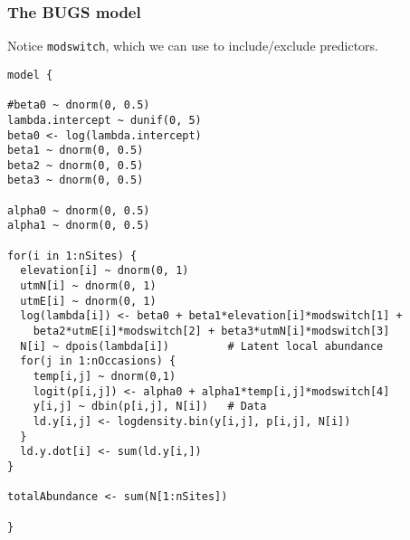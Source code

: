 \documentclass[color=usenames,dvipsnames]{beamer}\usepackage[]{graphicx}\usepackage[]{color}
\makeatletter
\newenvironment{kframe}{%
 \def\at@end@of@kframe{}%
 \ifinner\ifhmode%
  \def\at@end@of@kframe{\end{minipage}}%
  \begin{minipage}{\columnwidth}%
 \fi\fi%
 \def\FrameCommand##1{\hskip\@totalleftmargin \hskip-\fboxsep
 \colorbox{shadecolor}{##1}\hskip-\fboxsep
     \hskip-\linewidth \hskip-\@totalleftmargin \hskip\columnwidth}%
 \MakeFramed {\advance\hsize-\width
   \@totalleftmargin\z@ \linewidth\hsize
   \@setminipage}}%
 {\par\unskip\endMakeFramed%
 \at@end@of@kframe}
\newenvironment{knitrout}{}{} %
\makeatother
\begin{document}
\begin{frame}[fragile]
  \frametitle{The BUGS model}
  \small
  Notice \alert{\tt modswitch}, which we can use to include/exclude
  predictors. 
  \tiny
\begin{knitrout}\tiny
{}\color{fgcolor}\begin{kframe}
\begin{verbatim}
model {

#beta0 ~ dnorm(0, 0.5)  
lambda.intercept ~ dunif(0, 5)
beta0 <- log(lambda.intercept)
beta1 ~ dnorm(0, 0.5)
beta2 ~ dnorm(0, 0.5)
beta3 ~ dnorm(0, 0.5)

alpha0 ~ dnorm(0, 0.5)  
alpha1 ~ dnorm(0, 0.5)

for(i in 1:nSites) {
  elevation[i] ~ dnorm(0, 1)
  utmN[i] ~ dnorm(0, 1)
  utmE[i] ~ dnorm(0, 1)
  log(lambda[i]) <- beta0 + beta1*elevation[i]*modswitch[1] +
    beta2*utmE[i]*modswitch[2] + beta3*utmN[i]*modswitch[3] 
  N[i] ~ dpois(lambda[i])         # Latent local abundance
  for(j in 1:nOccasions) {
    temp[i,j] ~ dnorm(0,1)
    logit(p[i,j]) <- alpha0 + alpha1*temp[i,j]*modswitch[4]
    y[i,j] ~ dbin(p[i,j], N[i])   # Data
    ld.y[i,j] <- logdensity.bin(y[i,j], p[i,j], N[i])
  }
  ld.y.dot[i] <- sum(ld.y[i,])
}

totalAbundance <- sum(N[1:nSites])

}
\end{verbatim}
\end{kframe}
\end{knitrout}

\end{frame}
\end{document}
